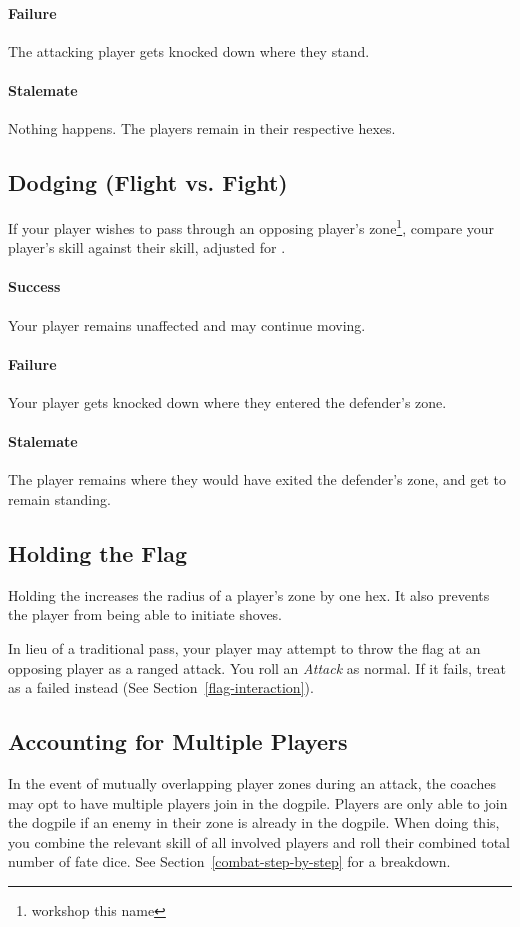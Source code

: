 \paragraph{Failure}
The attacking player gets knocked down where they stand.
\paragraph{Stalemate}
Nothing happens.
The players remain in their respective hexes.

\subsection{Dodging (Flight vs. Fight)}
If your player wishes to pass through an opposing player's zone\footnote{workshop this name}, compare your player's \flight{} skill against their \fight{} skill, adjusted for \fate{}.

\paragraph{Success}
Your player remains unaffected and may continue moving.
\paragraph{Failure}
Your player gets knocked down where they entered the defender's zone.
\paragraph{Stalemate}
The player remains where they would have exited the defender's zone, and get to remain standing.

\subsection{Holding the Flag}
Holding the \flag{} increases the radius of a player's zone by one hex.
It also prevents the player from being able to initiate shoves.

In lieu of a traditional pass, your player may attempt to throw the flag at an opposing player as a ranged attack.
You roll an \textit{Attack} as normal.
If it fails, treat as a failed \throw{} instead (See Section~\ref{flag-interaction}).

\subsection{Accounting for Multiple Players}
In the event of mutually overlapping player zones during an attack, the coaches may opt to have multiple players join in the dogpile.
Players are only able to join the dogpile if an enemy in their zone is already in the dogpile.
When doing this, you combine the relevant skill of all involved players and roll their combined total number of fate dice. 
See Section~\ref{combat-step-by-step} for a breakdown.

